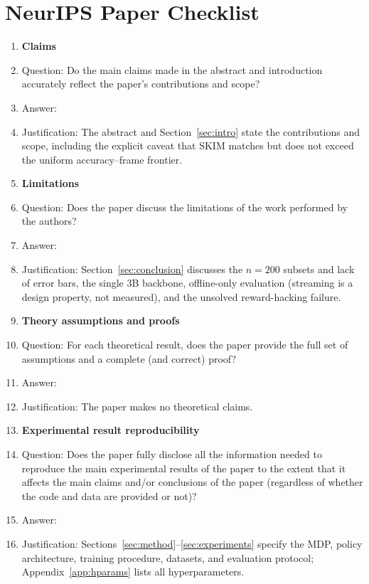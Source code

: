 \section*{NeurIPS Paper Checklist}

\begin{enumerate}

\item {\bf Claims}
    \item[] Question: Do the main claims made in the abstract and introduction accurately reflect the paper's contributions and scope?
    \item[] Answer: \answerYes{}
    \item[] Justification: The abstract and Section~\ref{sec:intro} state the contributions and scope, including the explicit caveat that SKIM matches but does not exceed the uniform accuracy--frame frontier.

\item {\bf Limitations}
    \item[] Question: Does the paper discuss the limitations of the work performed by the authors?
    \item[] Answer: \answerYes{}
    \item[] Justification: Section~\ref{sec:conclusion} discusses the $n{=}200$ subsets and lack of error bars, the single 3B backbone, offline-only evaluation (streaming is a design property, not measured), and the unsolved reward-hacking failure.

\item {\bf Theory assumptions and proofs}
    \item[] Question: For each theoretical result, does the paper provide the full set of assumptions and a complete (and correct) proof?
    \item[] Answer: \answerNA{}
    \item[] Justification: The paper makes no theoretical claims.

\item {\bf Experimental result reproducibility}
    \item[] Question: Does the paper fully disclose all the information needed to reproduce the main experimental results of the paper to the extent that it affects the main claims and/or conclusions of the paper (regardless of whether the code and data are provided or not)?
    \item[] Answer: \answerYes{}
    \item[] Justification: Sections~\ref{sec:method}--\ref{sec:experiments} specify the MDP, policy architecture, training procedure, datasets, and evaluation protocol; Appendix~\ref{app:hparams} lists all hyperparameters.


\end{enumerate}
